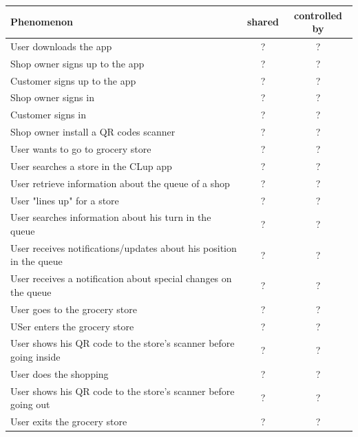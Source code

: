 \begin{tabular}{|l|c|c|}
    \hline
    \textbf{Phenomenon} & \textbf{shared} & \textbf{controlled by}\\
    \hline
    User downloads the app & ? & ? \\
    Shop owner signs up to the app & ? & ? \\
    Customer signs up to the app & ? & ? \\
    Shop owner signs in & ? & ? \\
    Customer signs in & ? & ? \\
    Shop owner install a QR codes scanner & ? & ? \\
    \hline
    User wants to go to grocery store & ? & ? \\
    User searches a store in the CLup app & ? & ? \\
    User retrieve information about the queue of a shop & ? & ? \\
    User "lines up" for a store & ? & ? \\
    User searches information about his turn in the queue & ? & ? \\
    User receives notifications/updates about his position in the queue & ? & ? \\
    User receives a notification about special changes on the queue & ? & ? \\ %
    User goes to the grocery store & ? & ? \\
    USer enters the grocery store & ? & ? \\
    User shows his QR code to the store's scanner before going inside & ? & ? \\
    User does the shopping & ? & ? \\
    User shows his QR code to the store's scanner before going out & ? & ? \\
    User exits the grocery store & ? & ? \\
    
    

\end{tabular}
